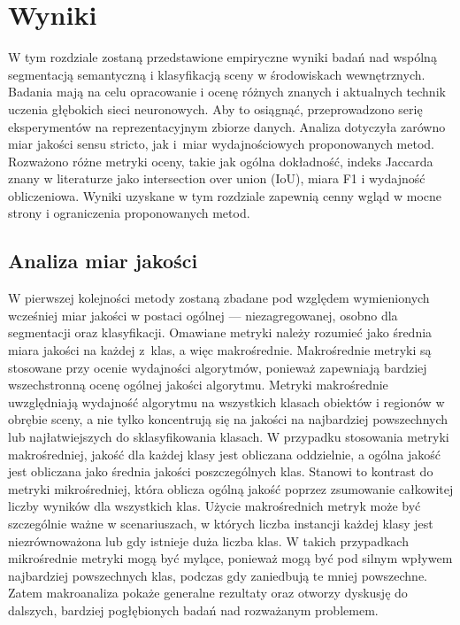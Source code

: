 \clearpage
\newpage %

\section{Wyniki}

W tym rozdziale zostaną przedstawione empiryczne wyniki badań nad wspólną segmentacją semantyczną i klasyfikacją sceny w środowiskach wewnętrznych. Badania mają na celu opracowanie i ocenę różnych znanych i aktualnych technik uczenia głębokich sieci neuronowych. Aby to osiągnąć, przeprowadzono serię eksperymentów na reprezentacyjnym zbiorze danych. Analiza dotyczyła zarówno miar jakości sensu stricto, jak i~miar wydajnościowych proponowanych metod. Rozważono różne metryki oceny, takie jak ogólna dokładność, indeks Jaccarda znany w literaturze jako intersection over union (IoU), miara F1 i wydajność obliczeniowa. Wyniki uzyskane w tym rozdziale zapewnią cenny wgląd w mocne strony i ograniczenia proponowanych metod.

\subsection{Analiza miar jakości}
W pierwszej kolejności metody zostaną zbadane pod względem wymienionych wcześniej miar jakości w postaci ogólnej — niezagregowanej, osobno dla segmentacji oraz klasyfikacji. Omawiane metryki należy rozumieć jako średnia miara jakości na każdej z~klas, a więc makrośrednie. Makrośrednie metryki są stosowane przy ocenie wydajności algorytmów, ponieważ zapewniają bardziej wszechstronną ocenę ogólnej jakości algorytmu. Metryki makrośrednie uwzględniają wydajność algorytmu na wszystkich klasach obiektów i regionów w obrębie sceny, a nie tylko koncentrują się na jakości na najbardziej powszechnych lub najłatwiejszych do sklasyfikowania klasach. W przypadku stosowania metryki makrośredniej, jakość dla każdej klasy jest obliczana oddzielnie, a ogólna jakość jest obliczana jako średnia jakości poszczególnych klas. Stanowi to kontrast do metryki mikrośredniej, która oblicza ogólną jakość poprzez zsumowanie całkowitej liczby wyników dla wszystkich klas.
Użycie makrośrednich metryk może być szczególnie ważne w scenariuszach, w których liczba instancji każdej klasy jest niezrównoważona lub gdy istnieje duża liczba klas. W takich przypadkach mikrośrednie metryki mogą być mylące, ponieważ mogą być pod silnym wpływem najbardziej powszechnych klas, podczas gdy zaniedbują te mniej powszechne. Zatem makroanaliza pokaże generalne rezultaty oraz otworzy dyskusję do dalszych, bardziej pogłębionych badań nad rozważanym problemem.

